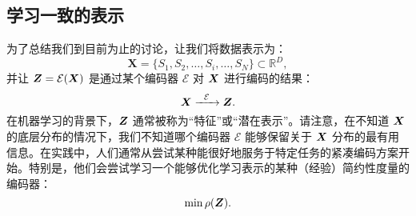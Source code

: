 \documentclass[../../book-main.tex]{subfiles}
\begin{document}







\subsection{学习一致的表示}

\label{sec:consistency}
为了总结我们到目前为止的讨论，让我们将数据表示为：
\begin{equation}
    \boldsymbol{X} = \{S_1, S_2, \ldots, S_i, \ldots, S_N\} \subset \mathbb{R}^D,
\end{equation}
并让 $\boldsymbol{Z} = \mathcal{E}(\bm{X})$ 是通过某个编码器 $\mathcal{E}$ 对 $\bm{X}$ 进行编码的结果：
\begin{equation}
    \bm{X}  \xrightarrow{\hspace{2mm} \mathcal{E}\hspace{2mm}} \bm{Z}.
    \label{eqn:open-loop}
\end{equation}
在机器学习的背景下，$\bm{Z}$ 通常被称为“特征”或“潜在表示”。请注意，在不知道 $\bm{X}$ 的底层分布的情况下，我们不知道哪个编码器 $\mathcal{E}$ 能够保留关于 $\bm{X}$ 分布的最有用信息。在实践中，人们通常从尝试某种能很好地服务于特定任务的紧凑编码方案开始。特别是，他们会尝试学习一个能够优化学习表示的某种（经验）简约性度量的编码器：
\begin{equation}
    \min \rho(\bm{Z}). 
\end{equation}
\end{document}
